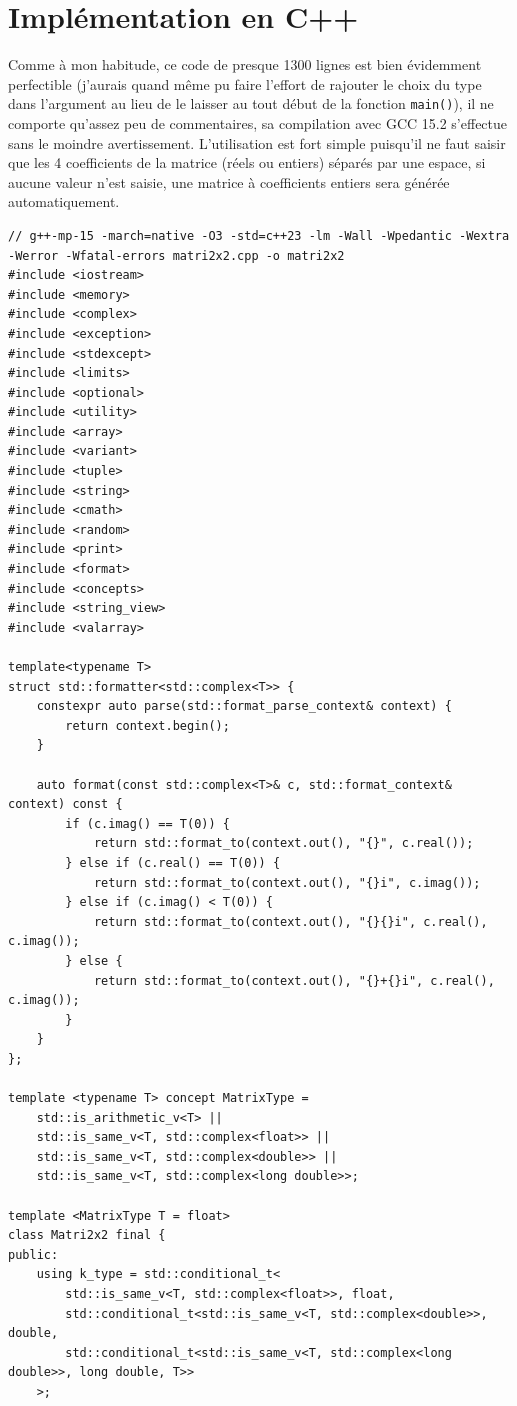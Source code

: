 \documentclass[11pt]{article}
\begin{document}
\section{Impl\'ementation en C++}
Comme \`a mon habitude, ce code de presque 1300 lignes est bien \'evidemment perfectible (j'aurais quand m\^eme pu faire l'effort de rajouter le choix du type dans l'argument au lieu de le laisser
au tout d\'ebut de la fonction \texttt{main()}), il ne comporte qu'assez peu de commentaires, sa compilation avec GCC 15.2 s'effectue sans le moindre avertissement. L'utilisation est fort simple puisqu'il
ne faut saisir que les 4 coefficients de la matrice (r\'eels ou entiers) s\'epar\'es par une espace, si aucune valeur n'est saisie, une matrice \`a coefficients entiers sera g\'en\'er\'ee automatiquement.
\begin{lstlisting}
// g++-mp-15 -march=native -O3 -std=c++23 -lm -Wall -Wpedantic -Wextra -Werror -Wfatal-errors matri2x2.cpp -o matri2x2
#include <iostream>
#include <memory>
#include <complex>
#include <exception>
#include <stdexcept>
#include <limits>
#include <optional>
#include <utility>
#include <array>
#include <variant>
#include <tuple>
#include <string>
#include <cmath>
#include <random>
#include <print>
#include <format>
#include <concepts>
#include <string_view>
#include <valarray>

template<typename T>
struct std::formatter<std::complex<T>> {
    constexpr auto parse(std::format_parse_context& context) {
        return context.begin();
    }
    
    auto format(const std::complex<T>& c, std::format_context& context) const {
        if (c.imag() == T(0)) {
            return std::format_to(context.out(), "{}", c.real());
        } else if (c.real() == T(0)) {
            return std::format_to(context.out(), "{}i", c.imag());
        } else if (c.imag() < T(0)) {
            return std::format_to(context.out(), "{}{}i", c.real(), c.imag());
        } else {
            return std::format_to(context.out(), "{}+{}i", c.real(), c.imag());
        }
    }
};

template <typename T> concept MatrixType =
    std::is_arithmetic_v<T> ||
    std::is_same_v<T, std::complex<float>> ||
    std::is_same_v<T, std::complex<double>> ||
    std::is_same_v<T, std::complex<long double>>;

template <MatrixType T = float> 
class Matri2x2 final {
public:    
    using k_type = std::conditional_t<
        std::is_same_v<T, std::complex<float>>, float,
        std::conditional_t<std::is_same_v<T, std::complex<double>>, double,
        std::conditional_t<std::is_same_v<T, std::complex<long double>>, long double, T>>
    >;
    

\end{lstlisting}
\end{document}
